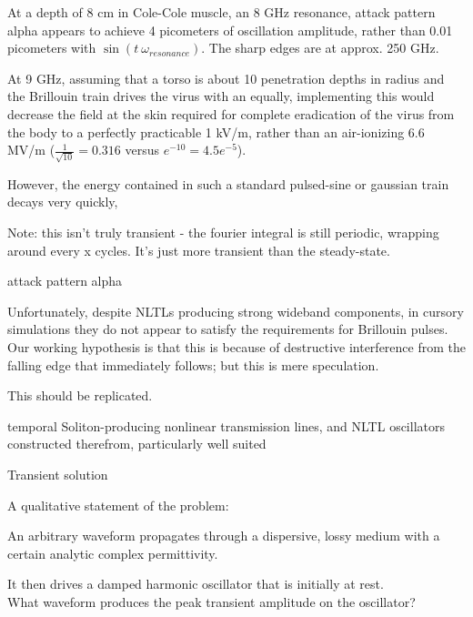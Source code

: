\documentclass[paper.tex]{subfiles}
\begin{document}
At a depth of 8 cm in Cole-Cole muscle, an 8 GHz resonance, attack pattern alpha appears to achieve 4 picometers of oscillation amplitude, rather than 0.01 picometers with $\sin(t\ \omega_{resonance})$. The sharp edges are at approx. 250 GHz. 



At 9 GHz, assuming that a torso is about 10 penetration depths in radius and the Brillouin train 
drives the virus with an equally, implementing this would decrease the field at the skin required 
for complete eradication of the virus from the body to a perfectly practicable 1 kV/m, rather than 
an air-ionizing 6.6 MV/m ($\frac{1}{\sqrt{10}}=0.316$ versus $e^{-10}=4.5e^{-5}$). 

However, the energy contained in such a standard pulsed-sine or gaussian train decays very quickly, 







Note: this isn't truly transient - the fourier integral is still periodic, wrapping around every x cycles. It's just more transient than the steady-state.




attack pattern alpha


Unfortunately, despite NLTLs producing strong wideband components, in cursory simulations they do 
not appear to satisfy the requirements for Brillouin pulses. Our working hypothesis is that this is 
because of destructive interference from the falling edge that immediately follows; but this is 
mere speculation.
\begin{autem}
	This should be replicated.
\end{autem}

temporal Soliton-producing nonlinear transmission lines, and NLTL oscillators constructed therefrom, particularly well suited 


Transient solution

\pagebreak
A qualitative statement of the problem:

\begin{toolchain}
An arbitrary waveform propagates through a dispersive, lossy medium with a certain analytic complex 
permittivity. 

It then drives a damped harmonic oscillator that is initially at rest.\\

What waveform produces the peak transient amplitude on the oscillator?
\end{toolchain}
\end{document}
